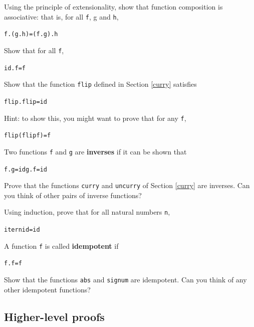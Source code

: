\begin{exercises}


\item
Using the principle of extensionality, show that function composition 
is associative: that is, for all \texttt{f}, {\mi
g} and \texttt{h},
\begin{alltt}
f . (g . h) = (f . g) . h
\end{alltt}

\item
Show that for all \texttt{f},
\begin{alltt}
id . f = f
\end{alltt}

\item
Show that the function \texttt{flip} defined in Section \ref{curry} satisfies
\begin{alltt}
flip . flip = id
\end{alltt}
Hint: to show this, you might want to prove that for any \texttt{f},
\begin{alltt}
flip (flip f) = f
\end{alltt}

\item
Two functions \texttt{f} and \texttt{g} are \textbf{inverses} if it can be shown that
\begin{alltt}
f . g = id              g . f = id
\end{alltt}
Prove that the functions \texttt{curry} and \texttt{uncurry} of Section \ref{curry}
are inverses. Can you think of other pairs of inverse functions?

\item
Using induction, prove that for all natural numbers \texttt{n},
\begin{alltt}
iter n id = id
\end{alltt}

\item
A function \texttt{f} is called \textbf{idempotent} if 
\begin{alltt}
f . f = f
\end{alltt}
Show that the functions \texttt{abs} and \texttt{signum} are idempotent. Can you
think of any other idempotent functions?
\end{exercises}

\subsection*{Higher-level proofs}

